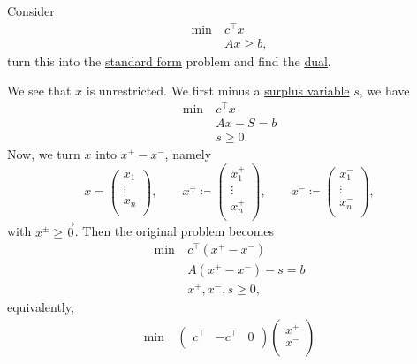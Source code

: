 \begin{problem*}
	Consider
	\[
		\begin{aligned}
			\min~ & c^{\top}x  \\
			      & Ax \geq b,
		\end{aligned}
	\]
	turn this into the \hyperref[def:standard-form]{standard form} problem and find the \hyperref[def:dual]{dual}.
\end{problem*}
\begin{answer}
	We see that \(x\) is unrestricted. We first minus a \hyperref[def:surplus-variable]{surplus variable} \(s\), we have
	\[
		\begin{aligned}
			\min~ & c^{\top}x \\
			      & Ax - S= b \\
			      & s \geq 0.
		\end{aligned}
	\]
	Now, we turn \(x\) into \(x^+ - x^-\), namely
	\[
		x = \begin{pmatrix}
			x_1    \\
			\vdots \\
			x_n    \\
		\end{pmatrix},\qquad
		x^+ \coloneqq \begin{pmatrix}
			x^+_1  \\
			\vdots \\
			x^+_n  \\
		\end{pmatrix},\qquad
		x^- \coloneqq \begin{pmatrix}
			x^-_1  \\
			\vdots \\
			x^-_n  \\
		\end{pmatrix},
	\]
	with \(x^\pm \geq \vec{0}\). Then the original problem becomes
	\[
		\begin{aligned}
			\min~ & c^{\top}(x^+ - x^-)  \\
			      & A(x^+ - x^-) - s = b \\
			      & x^+, x^-, s \geq 0,
		\end{aligned}
	\]
	equivalently,
	\[
		\begin{aligned}
			\min~ & \begin{pmatrix}
				        c^{\top} & -c^{\top} & 0 \\
			        \end{pmatrix}\begin{pmatrix}
				                     x^+ \\
				                     x^- \\

\end{pmatrix}
\end{aligned}\]
\end{answer}

